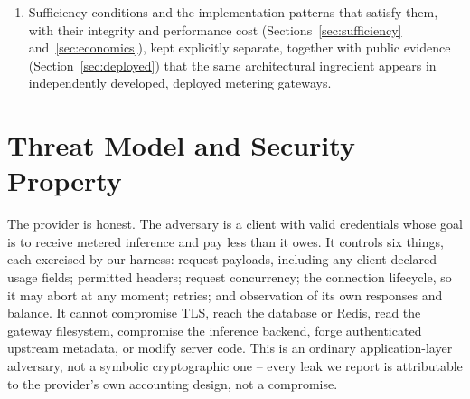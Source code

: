 \documentclass[manuscript,review]{acmart}
\begin{document}
\begin{enumerate}
three execution topologies, three accounting families including an asynchronous event
pipeline, two independent inference data planes, and a network-separated deployment, with
fail-closed integrity gates and independent recomputation.
\item Sufficiency conditions and the implementation patterns that satisfy them, with
their integrity and performance cost (Sections~\ref{sec:sufficiency}
and~\ref{sec:economics}), kept explicitly separate, together with
public evidence (Section~\ref{sec:deployed}) that the same architectural ingredient
appears in independently developed, deployed metering gateways.
\end{enumerate}

\begin{table}[t]
\caption{Adversary directions in LLM inference accounting. Prior work covers the first
three rows; this paper studies the fourth.}
\label{tab:quadrant}
\centering
{}
\end{table}

\section{Threat Model and Security Property}
\label{sec:threat}
The provider is honest. The adversary is a client with valid credentials whose goal is to
receive metered inference and pay less than it owes. It controls six things, each
exercised by our harness: request payloads, including any client-declared usage fields;
permitted headers; request concurrency; the connection lifecycle, so it may abort at any
moment; retries; and observation of its own responses and balance. It cannot compromise
TLS, reach the database or Redis, read the gateway filesystem, compromise the inference
backend, forge authenticated upstream metadata, or modify server code. This is an
ordinary application-layer adversary, not a symbolic cryptographic one -- every leak we
report is attributable to the provider's own accounting design, not a compromise.
\end{document}
